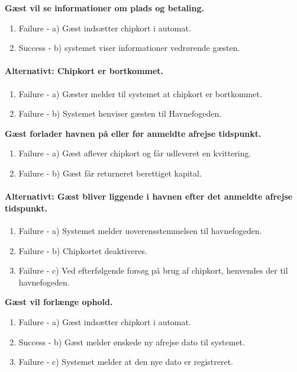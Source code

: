 {{	\item{\bf{Gæst vil se informationer om plads og betaling.}
	  \begin{enumerate}
			\item Failure -  a) Gæst indsætter chipkort i automat.
			\item Success -  b) systemet viser informationer vedrørende gæsten.
	   \end{enumerate}
     
	\paragraph{Alternativt: Chipkort er bortkommet.}
	  \begin{enumerate}
			\item Failure -  a) Gæster melder til systemet at chipkort er bortkommet.
			\item Failure -  b) Systemet henviser gæsten til Havnefogeden.
	   \end{enumerate}
     
	\item{\bf{Gæst forlader havnen på eller før anmeldte afrejse tidspunkt.}}
	  \begin{enumerate}
			\item Failure -  a) Gæst aflever chipkort og får udleveret en kvittering.
			\item Failure -  b) Gæst får returneret berettiget kapital.
	   \end{enumerate}
    
	\paragraph{Alternativt: Gæst bliver liggende i havnen efter det anmeldte afrejse tidspunkt.}
	  \begin{enumerate}
			\item Failure -  a) Systemet melder uoverensstemmelsen til havnefogeden.
			\item Failure -  b) Chipkortet deaktiveres.
			\item Failure -  c) Ved efterfølgende forsøg på brug af chipkort, henvendes der til havnefogeden.
	   \end{enumerate}
			
	\item{\bf{Gæst vil forlænge ophold.}
	  \begin{enumerate}
			\item Failure -  a) Gæst indsætter chipkort i automat.
			\item Success -  b) Gæst melder ønskede ny afrejse dato til systemet.
			\item Failure -  c) Systemet melder at den nye dato er registreret.
	   \end{enumerate}
     
}}}}
